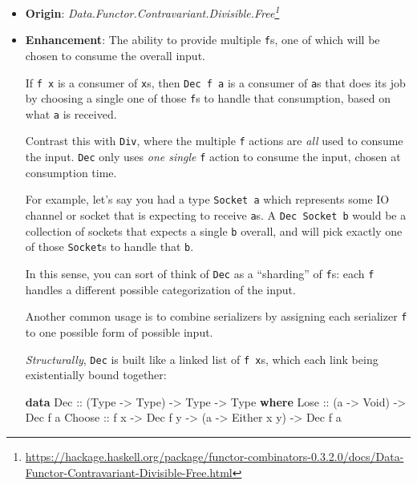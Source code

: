 \documentclass[]{article}
\newenvironment{Shaded}{}{}
\newcommand{\DataTypeTok}[1]{\textcolor[rgb]{0.56,0.13,0.00}{#1}}
\newcommand{\KeywordTok}[1]{\textcolor[rgb]{0.00,0.44,0.13}{\textbf{#1}}}
\newcommand{\NormalTok}[1]{#1}
\newcommand{\OtherTok}[1]{\textcolor[rgb]{0.00,0.44,0.13}{#1}}
\renewcommand{\href}[2]{#2\footnote{\url{#1}}}
\begin{document}
\begin{itemize}
\item
  \textbf{Origin}:
  \emph{\href{https://hackage.haskell.org/package/functor-combinators-0.3.2.0/docs/Data-Functor-Contravariant-Divisible-Free.html}{Data.Functor.Contravariant.Divisible.Free}}
\item
  \textbf{Enhancement}: The ability to provide multiple \texttt{f}s, one of
  which will be chosen to consume the overall input.

  If \texttt{f\ x} is a consumer of \texttt{x}s, then \texttt{Dec\ f\ a} is a
  consumer of \texttt{a}s that does its job by choosing a single one of those
  \texttt{f}s to handle that consumption, based on what \texttt{a} is received.

  Contrast this with \texttt{Div}, where the multiple \texttt{f} actions are
  \emph{all} used to consume the input. \texttt{Dec} only uses \emph{one single}
  \texttt{f} action to consume the input, chosen at consumption time.

  For example, let's say you had a type \texttt{Socket\ a} which represents some
  IO channel or socket that is expecting to receive \texttt{a}s. A
  \texttt{Dec\ Socket\ b} would be a collection of sockets that expects a single
  \texttt{b} overall, and will pick exactly one of those \texttt{Socket}s to
  handle that \texttt{b}.

  In this sense, you can sort of think of \texttt{Dec} as a ``sharding'' of
  \texttt{f}s: each \texttt{f} handles a different possible categorization of
  the input.

  Another common usage is to combine serializers by assigning each serializer
  \texttt{f} to one possible form of possible input.

  \emph{Structurally}, \texttt{Dec} is built like a linked list of
  \texttt{f\ x}s, which each link being existentially bound together:

\begin{Shaded}
\begin{Highlighting}[]
\KeywordTok{data} \DataTypeTok{Dec}\OtherTok{ ::}\NormalTok{ (}\DataTypeTok{Type} \OtherTok{{-}\textgreater{}} \DataTypeTok{Type}\NormalTok{) }\OtherTok{{-}\textgreater{}} \DataTypeTok{Type} \OtherTok{{-}\textgreater{}} \DataTypeTok{Type} \KeywordTok{where}
    \DataTypeTok{Lose}\OtherTok{   ::}\NormalTok{ (a }\OtherTok{{-}\textgreater{}} \DataTypeTok{Void}\NormalTok{) }\OtherTok{{-}\textgreater{}} \DataTypeTok{Dec}\NormalTok{ f a}
    \DataTypeTok{Choose}\OtherTok{ ::}\NormalTok{ f x }\OtherTok{{-}\textgreater{}} \DataTypeTok{Dec}\NormalTok{ f y }\OtherTok{{-}\textgreater{}}\NormalTok{ (a }\OtherTok{{-}\textgreater{}} \DataTypeTok{Either}\NormalTok{ x y) }\OtherTok{{-}\textgreater{}} \DataTypeTok{Dec}\NormalTok{ f a}
\end{Highlighting}
\end{Shaded}


\end{itemize}
\end{document}
